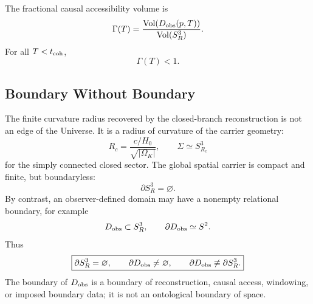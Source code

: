 \documentclass[aps,prd,onecolumn,superscriptaddress,longbibliography,nofootinbib,notitlepage]{revtex4-2}
\begin{document}
The fractional causal accessibility volume is
\begin{equation}
  \Gamma(T)
  = \frac{\mathrm{Vol}(D_{\rm obs}(p,T))}{\mathrm{Vol}(S^3_R)}.
\end{equation}
For all $T < t_{\rm coh}$,
\begin{equation}
  \Gamma(T) < 1.
\end{equation}

\subsection{Boundary Without Boundary}
\label{sec:boundary-without-boundary}

The finite curvature radius recovered by the closed-branch reconstruction is not
an edge of the Universe. It is a radius of curvature of the carrier geometry:
\begin{equation}
  R_c=\frac{c/H_0}{\sqrt{|\Omega_K|}},
  \qquad
  \Sigma\simeq S^3_{R_c}
\end{equation}
for the simply connected closed sector.
The global spatial carrier is compact and finite, but boundaryless:
\begin{equation}
  \partial S^3_R=\varnothing .
\end{equation}
By contrast, an observer-defined domain may have a nonempty relational boundary,
for example
\begin{equation}
  D_{\rm obs}\subset S^3_R,
  \qquad
  \partial D_{\rm obs}\simeq S^2 .
\end{equation}
Thus
\begin{equation}
  \boxed{
  \partial S^3_R=\varnothing,
  \qquad
  \partial D_{\rm obs}\neq\varnothing,
  \qquad
  \partial D_{\rm obs}\not\equiv\partial S^3_R .}
\end{equation}
The boundary of $D_{\rm obs}$ is a boundary of reconstruction, causal access,
windowing, or imposed boundary data; it is not an ontological boundary of space.
\end{document}
